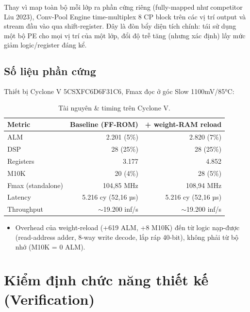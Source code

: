 \documentclass[12pt,a4paper]{article}
\begin{document}
Thay vì map toàn bộ mỗi lớp ra phần cứng riêng (fully-mapped như competitor Liu 2023),
Conv-Pool Engine time-multiplex 8 CP block trên các vị trí output và stream đầu vào qua
shift-register. Đây là đòn bẩy diện tích chính: tái sử dụng một bộ PE cho mọi vị trí của một
lớp, đổi độ trễ tăng (nhưng xác định) lấy mức giảm logic/register đáng kể.

\subsection{Số liệu phần cứng}

Thiết bị Cyclone V 5CSXFC6D6F31C6, Fmax đọc ở góc Slow 1100mV/85°C:

\begin{table}[h]
\centering
\caption{Tài nguyên \& timing trên Cyclone V.}
\begin{tabular}{lrr}
\toprule
\textbf{Metric} & \textbf{Baseline (FF-ROM)} & \textbf{+ weight-RAM reload}\\
\midrule
ALM & 2.201 (5\%) & 2.820 (7\%)\\
DSP & 28 (25\%) & 28 (25\%)\\
Registers & 3.177 & 4.852\\
M10K & 20 (4\%) & 28 (5\%)\\
Fmax (standalone) & 104,85 MHz & 108,94 MHz\\
Latency & 5.216 cy (52,16 µs) & 5.216 cy (52,16 µs)\\
Throughput & $\sim$19.200 inf/s & $\sim$19.200 inf/s\\
\bottomrule
\end{tabular}
\end{table}

\begin{itemize}
  \item Overhead của weight-reload (+619 ALM, +8 M10K) đến từ logic nạp-được (read-address
        adder, 8-way write decode, lắp ráp 40-bit), không phải từ bộ nhớ (M10K = 0 ALM).
\end{itemize}

\section{Kiểm định chức năng thiết kế (Verification)}
\end{document}
